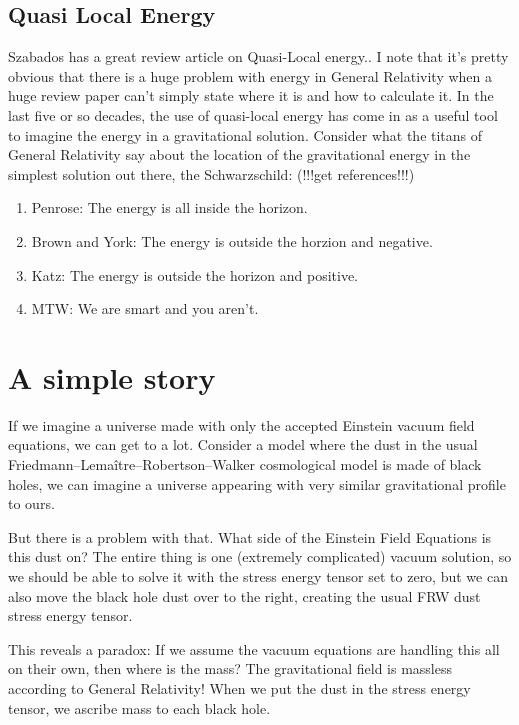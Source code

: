 \documentclass[../rzero]{subfiles}
\begin{document}
  \subsection{Quasi Local Energy}
  Szabados has a great review article on Quasi-Local energy.\cite{szabadosQuasiLocalEnergyMomentumAngular2009}. I note that it's pretty obvious that there is a huge problem with energy in General Relativity when a huge review paper can't simply state where it is and how to calculate it. 
  In the last five or so decades, the use of quasi-local energy has come in as a useful tool to imagine the energy in a gravitational solution. Consider what the titans of General Relativity say about the location of the gravitational energy in the simplest solution out there, the Schwarzschild:
  (!!!get references!!!) 
  \begin{enumerate}
  	\item Penrose: The energy is all inside the horizon.
  	\item Brown and York: The energy is outside the horzion and negative.
  	\item Katz: The energy is outside the horizon and positive. 
  	\item MTW: We are smart and you aren't. 
  \end{enumerate} 



\section{A simple story}
If we imagine a universe made with only the accepted Einstein vacuum field equations, we can get to a lot. Consider a model where the dust in the usual Friedmann–Lemaître–Robertson–Walker cosmological model is made of black holes, we can imagine a universe appearing with very similar gravitational profile to ours. 

But there is a problem with that. What side of the Einstein Field Equations is this dust on? The entire thing is one (extremely complicated) vacuum solution, so we should be able to solve it with the stress energy tensor set to zero, but we can also move the black hole dust over to the right, creating the usual FRW dust stress energy tensor. 

This reveals a paradox: If we assume the vacuum equations are handling this all on their own, then where is the mass? The gravitational field is massless according to General Relativity! When we put the dust in the stress energy tensor, we ascribe mass to each black hole. 
\end{document}
